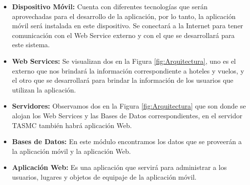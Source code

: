 \begin{itemize}
	\item \textbf{Dispositivo Móvil: }Cuenta con diferentes tecnologías que serán aprovechadas para el desarrollo de la aplicación, por lo tanto, la aplicación móvil será instalada en este dispositivo. Se conectará a la Internet para tener comunicación con el Web Service externo y con el que se desarrollará para este sistema.
	\item \textbf{Web Services: }Se visualizan dos en la Figura \ref{fig:Arquitectura}, uno es el externo que nos brindará la información correspondiente a hoteles y vuelos, y el otro que se desarrollará para brindar la información de los usuarios que utilizan la aplicación. 
	\item \textbf{Servidores: }Observamos dos en la Figura \ref{fig:Arquitectura} que son donde se alojan los Web Services y las Bases de Datos correspondientes, en el servidor TASMC también habrá aplicación Web.
	\item \textbf{Bases de Datos: }En este módulo encontramos los datos que se proveerán a la aplicación móvil y la aplicación Web.
	\item \textbf{Aplicación Web: }Es una aplicación que servirá para administrar a los usuarios, lugares y objetos de equipaje de la aplicación móvil.
\end{itemize}